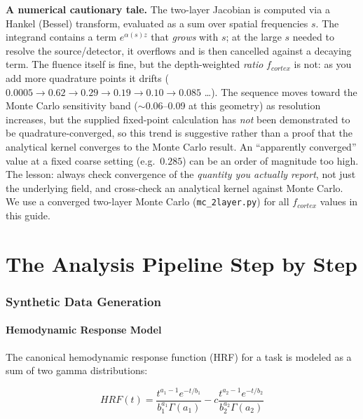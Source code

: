 \documentclass[12pt]{article}
\def\text#1{#1}%
\def\,{ }%
\begin{document}
\begin{keyinsight}
\textbf{A numerical cautionary tale.} The two-layer Jacobian is computed via a Hankel (Bessel) transform, evaluated as a sum over spatial frequencies $s$. The integrand contains a term $e^{\alpha(s)\,z}$ that \emph{grows} with $s$; at the large $s$ needed to resolve the source/detector, it overflows and is then cancelled against a decaying term. The fluence itself is fine, but the depth-weighted \emph{ratio} $f_{\text{cortex}}$ is not: as you add more quadrature points it drifts ($0.0005 \to 0.62 \to 0.29 \to 0.19 \to 0.10 \to 0.085$\,\ldots). The sequence moves toward the Monte Carlo sensitivity band ($\sim$0.06--0.09 at this geometry) as resolution increases, but the supplied fixed-point calculation has \emph{not} been demonstrated to be quadrature-converged, so this trend is suggestive rather than a proof that the analytical kernel converges to the Monte Carlo result. An ``apparently converged'' value at a fixed coarse setting (e.g.\ $0.285$) can be an order of magnitude too high. The lesson: always check convergence of the \emph{quantity you actually report}, not just the underlying field, and cross-check an analytical kernel against Monte Carlo. We use a converged two-layer Monte Carlo (\texttt{mc\_2layer.py}) for all $f_{\text{cortex}}$ values in this guide.
\end{keyinsight}

\newpage
\part{The Analysis Pipeline Step by Step}

\section{Synthetic Data Generation}

\subsection{Hemodynamic Response Model}

The canonical hemodynamic response function (HRF) for a task is modeled as a sum of two gamma distributions:

\begin{equation}
\text{HRF}(t) = \frac{t^{a_1-1} e^{-t/b_1}}{b_1^{a_1} \Gamma(a_1)} - c \, \frac{t^{a_2-1} e^{-t/b_2}}{b_2^{a_2} \Gamma(a_2)}
\end{equation}
\end{document}
